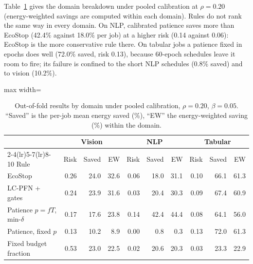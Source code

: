 \documentclass[3p,twocolumn,10pt]{elsarticle}
\theoremstyle{definition}
\begin{document}
Table~\ref{tab:domain} gives the domain breakdown under pooled calibration at $\rho=0.20$ (energy-weighted savings are computed within each domain). Rules do not rank the same way in every domain. On NLP, calibrated patience saves more than EcoStop (42.4\% against 18.0\% per job) at a higher risk (0.14 against 0.06): EcoStop is the more conservative rule there. On tabular jobs a patience fixed in epochs does well (72.0\% saved, risk 0.13), because 60-epoch schedules leave it room to fire; its failure is confined to the short NLP schedules (0.8\% saved) and to vision (10.2\%).

\begin{table}[t]
\centering
\caption{Out-of-fold results by domain under pooled calibration, $\rho=0.20$, $\beta=0.05$. ``Saved'' is the per-job mean energy saved (\%), ``EW'' the energy-weighted saving (\%) within the domain.}
\label{tab:domain}
\footnotesize
\begin{adjustbox}{max width=\textwidth}
\begin{tabular}{p{3.0cm}rrrrrrrrr}
\toprule
 & \multicolumn{3}{c}{Vision} & \multicolumn{3}{c}{NLP} & \multicolumn{3}{c}{Tabular} \\
\cmidrule(lr){2-4}\cmidrule(lr){5-7}\cmidrule(lr){8-10}
Rule & Risk & Saved & EW & Risk & Saved & EW & Risk & Saved & EW \\
\midrule
EcoStop & 0.26 & 24.0 & 32.6 & 0.06 & 18.0 & 31.1 & 0.10 & 66.1 & 61.3 \\
LC-PFN + gates & 0.24 & 23.9 & 31.6 & 0.03 & 20.4 & 30.3 & 0.09 & 67.4 & 60.9 \\
Patience $p{=}fT$, min-$\delta$ & 0.17 & 17.6 & 23.8 & 0.14 & 42.4 & 44.4 & 0.08 & 64.1 & 56.0 \\
Patience, fixed $p$ & 0.13 & 10.2 & 8.9 & 0.00 & 0.8 & 0.3 & 0.13 & 72.0 & 61.3 \\
Fixed budget fraction & 0.53 & 23.0 & 22.5 & 0.02 & 20.6 & 20.3 & 0.03 & 23.3 & 22.9 \\
\bottomrule
\end{tabular}
\end{adjustbox}
\end{table}
\end{document}
